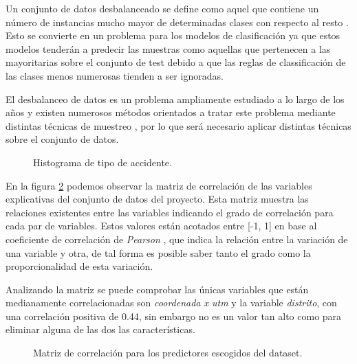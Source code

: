\begin{enumerate}
                    Un conjunto de datos desbalanceado se define como aquel que contiene un número de instancias mucho mayor de determinadas clases con respecto al resto \cite{WhyImbalancedDataIsAProblem}. Esto se convierte en un problema para los modelos de clasificación ya que estos modelos tenderán a predecir las muestras como aquellas que pertenecen a las mayoritarias sobre el conjunto de test debido a que las reglas de classificación de las clases menos numerosas tienden a ser ignoradas.

                    El desbalanceo de datos es un problema ampliamente estudiado a lo largo de los años y existen numerosos métodos orientados a tratar este problema mediante distintas técnicas de muestreo \cite{ImbalancedDataReview}, por lo que será necesario aplicar distintas técnicas sobre el conjunto de datos.


                    \begin{figure}[H]
                        \centering
                        
                        \caption{Histograma de tipo de accidente.}
                        \label{CasualtyClassImage}
                     \end{figure}


                    En la figura \ref{CorrelationMatrixImage} podemos observar la matriz de correlación de las variables explicativas del conjunto de datos del proyecto. Esta matriz muestra las relaciones existentes entre las variables indicando el grado de correlación para cada par de variables. Estos valores están acotados entre [-1, 1] en base al coeficiente de correlación de \textit{Pearson} \cite{PearsonCoefficientCorrelationMatrix}, que indica la relación entre la variación de una variable y otra, de tal forma es posible saber tanto el grado como la proporcionalidad de esta variación.

                    Analizando la matriz se puede comprobar las únicas variables que están medianamente correlacionadas son \textit{coordenada x utm} y la variable \textit{distrito}, con una correlación positiva de 0.44, sin embargo no es un valor tan alto como para eliminar alguna de las dos las características.

                    \begin{figure}[H]
                        \centering
                        
                        \caption{Matriz de correlación para los predictores escogidos del dataset.}
                        \label{CorrelationMatrixImage}
                     \end{figure}



\end{enumerate}
